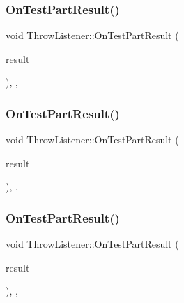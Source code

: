 \subsubsection{\texorpdfstring{OnTestPartResult()}{OnTestPartResult()}\hspace{0.1cm}{\footnotesize\ttfamily [1/3]}}
{\footnotesize\ttfamily void Throw\+Listener\+::\+On\+Test\+Part\+Result (\begin{DoxyParamCaption}\item[{const testing\+::\+Test\+Part\+Result \&}]{result }\end{DoxyParamCaption})\hspace{0.3cm}{\ttfamily [inline]}, {\ttfamily [override]}, {\ttfamily [private]}}

\mbox{\label{class_throw_listener_a7756195364cd836b096cd107d46d5ae8}} 
\subsubsection{\texorpdfstring{OnTestPartResult()}{OnTestPartResult()}\hspace{0.1cm}{\footnotesize\ttfamily [2/3]}}
{\footnotesize\ttfamily void Throw\+Listener\+::\+On\+Test\+Part\+Result (\begin{DoxyParamCaption}\item[{const testing\+::\+Test\+Part\+Result \&}]{result }\end{DoxyParamCaption})\hspace{0.3cm}{\ttfamily [inline]}, {\ttfamily [override]}, {\ttfamily [private]}}

\mbox{\label{class_throw_listener_a7756195364cd836b096cd107d46d5ae8}} 
\subsubsection{\texorpdfstring{OnTestPartResult()}{OnTestPartResult()}\hspace{0.1cm}{\footnotesize\ttfamily [3/3]}}
{\footnotesize\ttfamily void Throw\+Listener\+::\+On\+Test\+Part\+Result (\begin{DoxyParamCaption}\item[{const testing\+::\+Test\+Part\+Result \&}]{result }\end{DoxyParamCaption})\hspace{0.3cm}{\ttfamily [inline]}, {\ttfamily [override]}, {\ttfamily [private]}}



